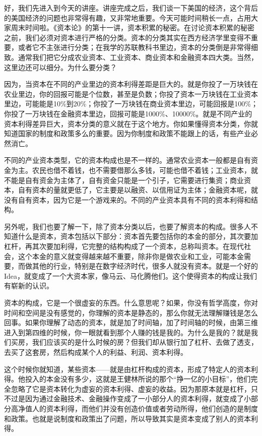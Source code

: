\documentclass[UTF8, 12pt, a4paper]{ctexrep}
\begin{document}
好，我们先进入到今天的讲座。讲座完成之后，我们谈一下美国的经济，这个背后的美国经济的问题也非常得有趣，又非常地重要。今天可能时间稍长一点，占用大家周末时间啦。《资本论》的第十一讲，资本积累的秘密。在讨论资本积累的秘密之前，我们必须对资本进行严格的分类。资本的分类其实在西方经济学里变得不重要，或者它不主张进行分类；在我学的苏联教科书里边，资本的分类倒是非常得细致。通常我们把它分成农业资本、工业资本、商业资本和金融资本四大类。当然，这里边还可以细分。为什么要分类？

因为，当资本在不同的产业里边的资本利得差距是巨大的。就是你投了一万块钱在农业里边，你的回报可能是个位数，甚至是负数；你投了资本一万块钱在工业资本里边，可能能是10\%到20\%；你投了一万块钱在商业资本里边，可能回报是100\%；你投了一万块钱在金融资本里边，回报可能是1000\%、10000\%。就是不同产业的资本利得差异巨大，资本分类的意义就在于这个地方。你如果懂得资本分类，你就知道国家的制度和政策多么的重要。因为你制度和政策不能跟上的话，有些产业必然消亡。

不同的产业资本类型，它的资本构成也是不一样的。通常农业资本一般都是自有资金为主。农民也借不着钱，也不需要借那么多钱，可能也借不着钱；工业资本，就不能是自有资金为主体了，自有资金只能是一个引子，它需要进行集资；商业资本，自有资本的量就更低了，它主要是以融资、以信用证为主体；金融资本呢，就没有自有资本，因为它是一个游戏来的。不同的产业资本具有不同的资本利得和结构。

另外呢，我们也要了解一下，除了资本分类以后，也要了解资本的构成。很多人不知道什么是资本，资本包括以下部分：资本首先要包括你的本金的部分，其次要加杠杆，再其次要加利得，它完整的结构构成了一个资本，总称叫资本。在现代社会，这个本金的意义就变得越来越不重要，除非你是做农业和工业，可能本金需要，而做其他的行业，特别是在数字经济时代，很多人就没有资本。就是一个好的Idea，就变成了一个大资本家，像马云、马化腾他们。这个使得资本的构成让我们有崭新的认识。

资本的构成，它是一个很虚妄的东西。什么意思呢？如果，你没有哲学高度，你对时间和空间是没有感觉的，你理解的资本是静态的，那么你就无法理解赚钱是怎么回事。如果你理解了动态的资本，就是加了时间轴，加了时间轴的时候，由第三维进入到第四维的时候，你一眼就看到那个人赚的钱是我的。为什么是我的？就是我们买房，我们应该买的是什么时候的房？但我们却从银行加了杠杆、去做了透支，去买了这套房，然后构成某个人的利益、利润、资本利得。

这个时候你就知道，某些资本——就是由杠杆构成的资本，形成了特定人的资本利得。他投入的本金没有多少，这就是王健林所说的那个“挣一亿的小目标”，他们完全忽略了它是资本转化为虚妄的资本利得、虚妄的收益。因为那原本就是杠杆，只不过是因为通过金融技术、金融操作变成了一小部分人的资本利得，就变成了小部分高净值人的资本利得，而他们并没有创造价值或者劳动所得，他们创造的是制度和政策。也就是说制度和政策出了问题，所以导致其实是资本变成了别人的资本利得。
\end{document}
